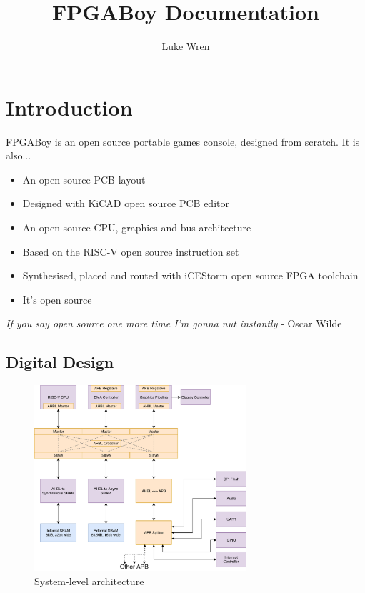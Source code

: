 \documentclass{article}
\title{FPGABoy Documentation}
\author{Luke Wren}
\begin{document}
\maketitle
\tableofcontents
\newpage
{}

\section{Introduction}

FPGABoy is an open source portable games console, designed from scratch. It is also...
\begin{itemize}
\item An open source PCB layout
\item Designed with KiCAD open source PCB editor
\item An open source CPU, graphics and bus architecture
\item Based on the RISC-V open source instruction set
\item Synthesised, placed and routed with iCEStorm open source FPGA toolchain
\item It's open source
\end{itemize}

\begin{displayquote}
\textit{If you say open source one more time I'm gonna nut instantly} - Oscar Wilde
\end{displayquote}

\subsection{Digital Design}

\begin{figure}[!htb]
\caption{System-level architecture}
\label{diagram:system_arch}
\centering
\includegraphics[width=0.7\textwidth]{diagrams/system_arch.pdf}
\end{figure}
\end{document}
